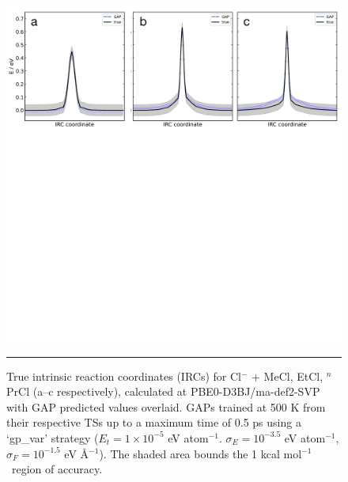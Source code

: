 \documentclass[11pt]{article}
\numberwithin{equation}{subsection}
\newcommand{\kcal}{kcal mol$^{-1}$}
\begin{document}
\begin{figure}[h!]
	\centering
	\vspace{0.5cm}
	\includegraphics[width=\textwidth]{figSX19a.pdf}
	\vspace{0.1cm}
	\hrule
	\vspace{0.1cm}
	\caption{True intrinsic reaction coordinates (IRCs) for Cl$^{-}$ + MeCl, EtCl, ${}^n$PrCl  (a--c respectively), calculated at PBE0-D3BJ/ma-def2-SVP with GAP predicted values overlaid. GAPs trained at 500 K from their respective TSs up to a maximum time of 0.5 ps using a `gp\_var' strategy ($E_t = 1\times10^{-5}$ eV atom${}^{-1}$. $\sigma_E = 10^{-3.5}$ eV atom${}^{-1}$, $\sigma_F = 10^{-1.5}$ eV \AA${}^{-1}$). The shaded area bounds the 1 \kcal~region of accuracy.}
	\label{fig::SX19a}
\end{figure}
\end{document}
